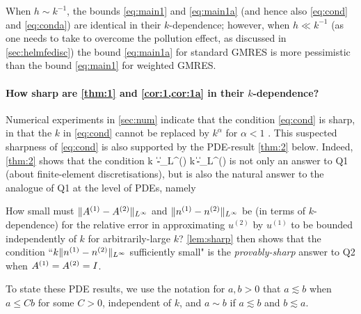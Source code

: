 \bre
When $h\sim  k^{-1}$, the bounds \cref{eq:main1} and \cref{eq:main1a} (and hence also \cref{eq:cond} and \cref{eq:conda}) are identical in their $k$-dependence; however, when $h\ll k^{-1}$ (as one needs to take to overcome the pollution effect, as discussed in \cref{sec:helmfedisc}) the bound \cref{eq:main1a} for standard GMRES is more pessimistic than the bound \cref{eq:main1} for weighted GMRES.
\ere


\paragraph{How sharp are \cref{thm:1} and \cref{cor:1,cor:1a} in their $k$-dependence?}
Numerical experiments in \cref{sec:num} indicate that the condition \cref{eq:cond} is sharp, in that the $k$ in \cref{eq:cond} cannot be replaced by $k^\alpha$ for $\alpha<1$ . This suspected sharpness of \cref{eq:cond} is also supported by the PDE-result \cref{thm:2} below. Indeed, \cref{thm:2} %
 shows that the condition
\beqs
k\,
\big\|\Aso-\Ast\big\|_{L^\infty(\DR)} \quad{} \quad k\,\big\|\nso-\nst\big\|_{L^\infty(\DR)}
\quad{}
\eeqs
is not only an answer to Q1 (about finite-element discretisations), but is also the natural answer to the analogue of Q1 at the level of PDEs, namely 
\bit
\item[Q2.]
How small must $\|{A}^{(1)} - {A}^{(2)}\|_{L^\infty}$ and 
$\|{n}^{(1)} - {n}^{(2)}\|_{L^\infty}$ be (in terms of $k$-dependence) for the relative error in approximating 
$u^{(2)}$ by $u^{(1)}$ to be bounded independently of $k$ for arbitrarily-large $k$? 
\eit
\cref{lem:sharp} then shows that the condition ``$k\|{n}^{(1)} - {n}^{(2)}\|_{L^\infty}$ sufficiently small" is the \emph{provably-sharp} answer to Q2 when ${A}^{(1)}= {A}^{(2)}= I$.

To state these PDE results, we use the notation for $a,b>0$ that $a\lesssim b$ when $a\leq C b$ for some $C>0$, independent of $k$, and $a\sim b$ if $a\lesssim b$ and $b\lesssim a$.



